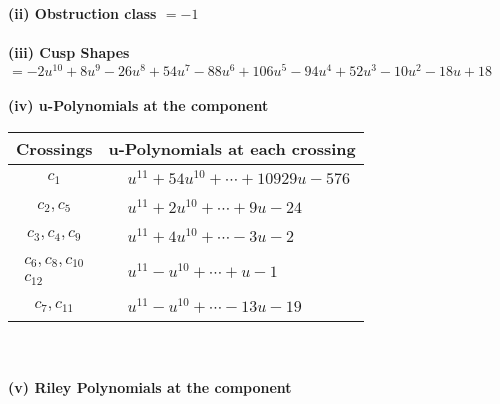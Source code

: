 \documentclass[1p]{elsarticle_modified}
\theoremstyle{definition}
\begin{document}
\flushleft \textbf{(ii) Obstruction class $= -1$}\\~\\
\flushleft \textbf{(iii) Cusp Shapes $= -2 u^{10}+8 u^9-26 u^8+54 u^7-88 u^6+106 u^5-94 u^4+52 u^3-10 u^2-18 u+18$}\\~\\
\newpage\renewcommand{\arraystretch}{1}
\flushleft \textbf{(iv) u-Polynomials at the component}\newline \\
\begin{tabular}{m{50pt}|m{274pt}}
Crossings & \hspace{64pt}u-Polynomials at each crossing \\
\hline $$\begin{aligned}c_{1}\end{aligned}$$&$\begin{aligned}
&u^{11}+54 u^{10}+\cdots+10929 u-576
\end{aligned}$\\
\hline $$\begin{aligned}c_{2},c_{5}\end{aligned}$$&$\begin{aligned}
&u^{11}+2 u^{10}+\cdots+9 u-24
\end{aligned}$\\
\hline $$\begin{aligned}c_{3},c_{4},c_{9}\end{aligned}$$&$\begin{aligned}
&u^{11}+4 u^{10}+\cdots-3 u-2
\end{aligned}$\\
\hline $$\begin{aligned}c_{6},c_{8},c_{10}\\c_{12}\end{aligned}$$&$\begin{aligned}
&u^{11}- u^{10}+\cdots+u-1
\end{aligned}$\\
\hline $$\begin{aligned}c_{7},c_{11}\end{aligned}$$&$\begin{aligned}
&u^{11}- u^{10}+\cdots-13 u-19
\end{aligned}$\\
\hline
\end{tabular}\\~\\
\newpage\renewcommand{\arraystretch}{1}
\flushleft \textbf{(v) Riley Polynomials at the component}\newline \\
\end{document}
